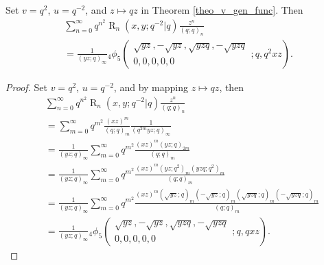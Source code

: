 \documentclass{cimart}
\DeclareMathOperator{\opR}{R}
\begin{document}
\begin{corollary}
Set $v=q^2$, $u=q^{-2}$, and $z\mapsto qz$ in Theorem \ref{theo_v_gen_func}. Then 
\begin{multline}
    \sum_{n=0}^{\infty}q^{n^2}\opR_{n}(x,y;q^{-2}|q)\frac{z^n}{(q;q)_{n}}\\
    =\frac{1}{(yz;q)_{\infty}}{}_{4}\phi_{5}\left(
        \begin{array}{c}
             \sqrt{yz},-\sqrt{yz},\sqrt{yzq},-\sqrt{yzq} \\
             0,0,0,0,0
        \end{array};
        q,q^2xz
        \right).
\end{multline}
\end{corollary}
\begin{proof}
Set $v=q^2$, $u=q^{-2}$, and by mapping $z\mapsto qz$, then
    \begin{align*}
        &\sum_{n=0}^{\infty}q^{n^2}\opR_{n}(x,y;q^{-2}|q)\frac{z^n}{(q;q)_{n}}\\
        &=\sum_{m=0}^{\infty}q^{m^2}\frac{(xz)^m}{(q;q)_{m}}
        \frac{1}{(q^{2m}yz;q)_{\infty}}\\
        &=\frac{1}{(yz;q)_{\infty}}\sum_{m=0}^{\infty}q^{m^2}\frac{(xz)^m(yz;q)_{2m}}{(q;q)_{m}}\\
        &=\frac{1}{(yz;q)_{\infty}}\sum_{m=0}^{\infty}q^{m^2}\frac{(xz)^m(yz;q^2)_{m}(yzq;q^2)_{m}}{(q;q)_{m}}\\
        &=\frac{1}{(yz;q)_{\infty}}\sum_{m=0}^{\infty}q^{m^2}\frac{(xz)^m(\sqrt{yz};q)_{m}(-\sqrt{yz};q)_{m}(\sqrt{yzq};q)_{m}(-\sqrt{yzq};q)_{m}}{(q;q)_{m}}\\
        &=\frac{1}{(yz;q)_{\infty}}{}_{4}\phi_{5}\left(
        \begin{array}{c}
             \sqrt{yz},-\sqrt{yz},\sqrt{yzq},-\sqrt{yzq} \\
             0,0,0,0,0
        \end{array};
        q,qxz
        \right).
    \end{align*}
\end{proof}
\end{document}
